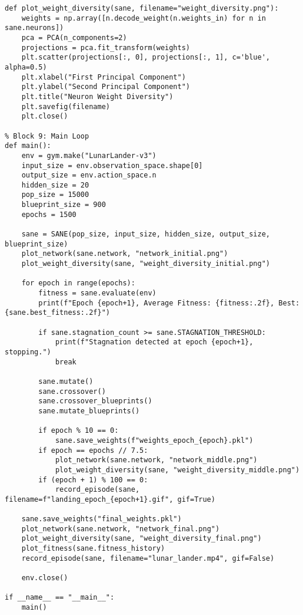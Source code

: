 \documentclass[a4paper,12pt]{article}
\begin{document}
\begin{lstlisting}
def plot_weight_diversity(sane, filename="weight_diversity.png"):
    weights = np.array([n.decode_weight(n.weights_in) for n in sane.neurons])
    pca = PCA(n_components=2)
    projections = pca.fit_transform(weights)
    plt.scatter(projections[:, 0], projections[:, 1], c='blue', alpha=0.5)
    plt.xlabel("First Principal Component")
    plt.ylabel("Second Principal Component")
    plt.title("Neuron Weight Diversity")
    plt.savefig(filename)
    plt.close()

% Block 9: Main Loop
def main():
    env = gym.make("LunarLander-v3")
    input_size = env.observation_space.shape[0]
    output_size = env.action_space.n
    hidden_size = 20
    pop_size = 15000
    blueprint_size = 900
    epochs = 1500

    sane = SANE(pop_size, input_size, hidden_size, output_size, blueprint_size)
    plot_network(sane.network, "network_initial.png")
    plot_weight_diversity(sane, "weight_diversity_initial.png")

    for epoch in range(epochs):
        fitness = sane.evaluate(env)
        print(f"Epoch {epoch+1}, Average Fitness: {fitness:.2f}, Best: {sane.best_fitness:.2f}")

        if sane.stagnation_count >= sane.STAGNATION_THRESHOLD:
            print(f"Stagnation detected at epoch {epoch+1}, stopping.")
            break

        sane.mutate()
        sane.crossover()
        sane.crossover_blueprints()
        sane.mutate_blueprints()

        if epoch % 10 == 0:
            sane.save_weights(f"weights_epoch_{epoch}.pkl")
        if epoch == epochs // 7.5:
            plot_network(sane.network, "network_middle.png")
            plot_weight_diversity(sane, "weight_diversity_middle.png")
        if (epoch + 1) % 100 == 0:
            record_episode(sane, filename=f"landing_epoch_{epoch+1}.gif", gif=True)

    sane.save_weights("final_weights.pkl")
    plot_network(sane.network, "network_final.png")
    plot_weight_diversity(sane, "weight_diversity_final.png")
    plot_fitness(sane.fitness_history)
    record_episode(sane, filename="lunar_lander.mp4", gif=False)

    env.close()

if __name__ == "__main__":
    main()
\end{lstlisting}
\end{document}
